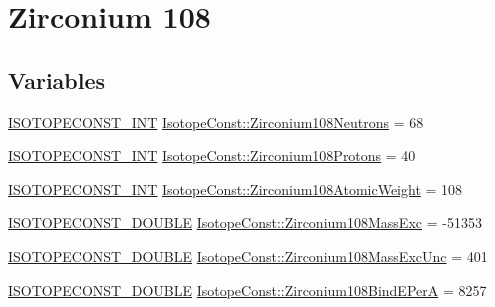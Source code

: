 \hypertarget{group___isotope_const-_zirconium-_zr108}{}\section{Zirconium 108}
\label{group___isotope_const-_zirconium-_zr108}
\subsection*{Variables}
\begin{DoxyCompactItemize}
\item 
\mbox{\hyperlink{group___isotope_const-_macros_ga5f18360b3e99483a35c32d789e62621c}{I\+S\+O\+T\+O\+P\+E\+C\+O\+N\+S\+T\+\_\+\+I\+NT}} \mbox{\hyperlink{group___isotope_const-_zirconium-_zr108_gaf2670345bce6830f4fa6a3d3ba0e9311}{Isotope\+Const\+::\+Zirconium108\+Neutrons}} = 68
\item 
\mbox{\hyperlink{group___isotope_const-_macros_ga5f18360b3e99483a35c32d789e62621c}{I\+S\+O\+T\+O\+P\+E\+C\+O\+N\+S\+T\+\_\+\+I\+NT}} \mbox{\hyperlink{group___isotope_const-_zirconium-_zr108_ga44b0b05665a37c9c886cd040cf3de88a}{Isotope\+Const\+::\+Zirconium108\+Protons}} = 40
\item 
\mbox{\hyperlink{group___isotope_const-_macros_ga5f18360b3e99483a35c32d789e62621c}{I\+S\+O\+T\+O\+P\+E\+C\+O\+N\+S\+T\+\_\+\+I\+NT}} \mbox{\hyperlink{group___isotope_const-_zirconium-_zr108_gac4d35472c77e71317f239d4aba09b916}{Isotope\+Const\+::\+Zirconium108\+Atomic\+Weight}} = 108
\item 
\mbox{\hyperlink{group___isotope_const-_macros_ga8f45a7272ce02c0b4c65c44636ed719a}{I\+S\+O\+T\+O\+P\+E\+C\+O\+N\+S\+T\+\_\+\+D\+O\+U\+B\+LE}} \mbox{\hyperlink{group___isotope_const-_zirconium-_zr108_ga99f7ed44cde2a4651048c36a1f326a17}{Isotope\+Const\+::\+Zirconium108\+Mass\+Exc}} = -\/51353
\item 
\mbox{\hyperlink{group___isotope_const-_macros_ga8f45a7272ce02c0b4c65c44636ed719a}{I\+S\+O\+T\+O\+P\+E\+C\+O\+N\+S\+T\+\_\+\+D\+O\+U\+B\+LE}} \mbox{\hyperlink{group___isotope_const-_zirconium-_zr108_ga81f32de2d6b5694c0f964d71b7f744c8}{Isotope\+Const\+::\+Zirconium108\+Mass\+Exc\+Unc}} = 401
\item 
\mbox{\hyperlink{group___isotope_const-_macros_ga8f45a7272ce02c0b4c65c44636ed719a}{I\+S\+O\+T\+O\+P\+E\+C\+O\+N\+S\+T\+\_\+\+D\+O\+U\+B\+LE}} \mbox{\hyperlink{group___isotope_const-_zirconium-_zr108_gaee0e6f77d3d127424e2cfc68be0e0ad4}{Isotope\+Const\+::\+Zirconium108\+Bind\+E\+PerA}} = 8257
\item 

\end{DoxyCompactItemize}
